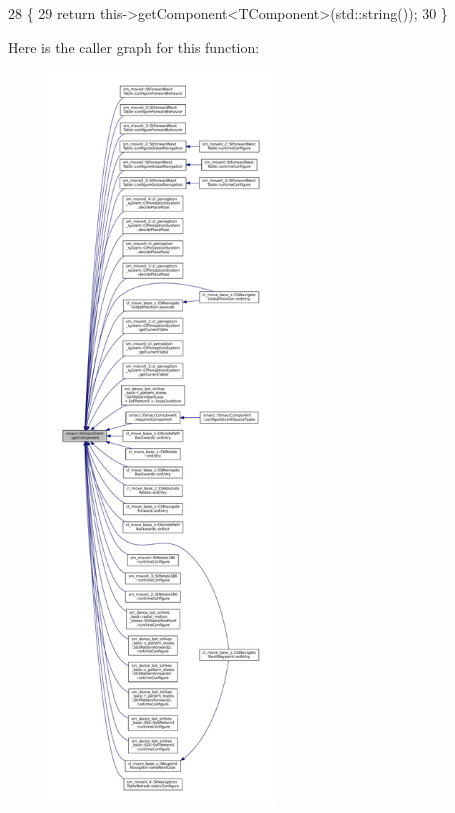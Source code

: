 \begin{DoxyCode}
28     \{
29         \textcolor{keywordflow}{return} this->getComponent<TComponent>(std::string());
30     \}
\end{DoxyCode}
Here is the caller graph for this function\+:
\nopagebreak
\begin{figure}[H]
\begin{center}
\leavevmode
\includegraphics[height=550pt]{classsmacc_1_1ISmaccClient_adef78db601749ca63c19e74a27cb88cc_icgraph}
\end{center}
\end{figure}
\mbox{\label{classsmacc_1_1ISmaccClient_ad72cba3ce7c5b3bd3977747dc6d5fb69}} 
